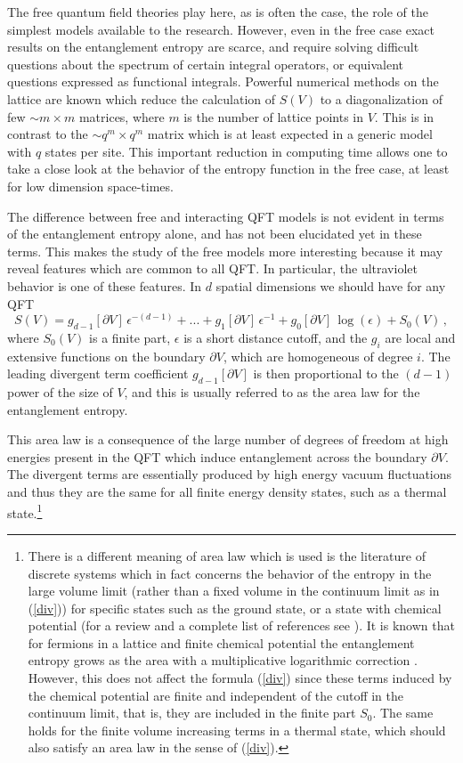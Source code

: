 \documentclass[a4paper]{article}
\begin{document}
The free quantum field theories play here, as is often the case, the role of the simplest models available to the research. However, even in the free case exact results on the entanglement entropy are scarce, and require  solving difficult questions about the spectrum of certain integral operators, or equivalent questions expressed as functional integrals. Powerful numerical methods on the lattice are known which reduce the calculation of $S(V)$ to a diagonalization of few $\sim m\times m$ matrices, where $m$ is the number of lattice points in $V$. 
This is in contrast to the $\sim q^m\times q^m$ matrix which is at least expected in a generic model with $q$ states per site. This important reduction in computing time allows one to take a close look at the behavior of the entropy function in the free case, at least for low dimension space-times. 
 
The difference between free and interacting QFT models is not evident in terms of the entanglement entropy alone, and has not been elucidated yet in these terms. This makes the study of the free models more interesting because it may reveal features which are common to all QFT. In particular, the ultraviolet behavior is one of these features. In $d$ spatial dimensions we should have for any QFT 
 \begin{equation}
 S(V)=g_{d-1}[\partial V]\,\epsilon^{-(d-1)}+...+ g_1[\partial V]\,\epsilon^{-1} + g_0[\partial V]\,\log (\epsilon)+ S_0(V)\,,   \label{div}
 \end{equation}
where $S_0(V)$ is a finite part, $\epsilon$ is a short distance cutoff, and the $g_i$ are local and extensive  functions on the boundary $\partial V$, which are homogeneous of degree $i$. The leading divergent term coefficient  $g_{d-1}[\partial V]$ is then proportional to the $(d-1)$ power of the size of $V$, and this is usually referred to as the area law for the entanglement entropy. 

This area law is a consequence of the large number of degrees of freedom at high energies present in the QFT which induce entanglement across the boundary $\partial V$. The divergent terms are essentially produced by high energy vacuum fluctuations and thus they are the same for all finite energy density states, such as a thermal state.\footnote{There is a different meaning of area law which is used is the literature of discrete systems which in fact concerns the behavior of the entropy in the large volume limit (rather than a fixed volume in the continuum limit as in (\ref{div})) for specific states such as the ground state, or a state with chemical potential (for a review and a complete list of references see \cite{ecp}). It is known that for fermions in a lattice and finite chemical potential the entanglement entropy grows as the area with a multiplicative logarithmic correction \cite{fermionic1}. However, this does not affect the formula (\ref{div}) since these terms induced by the chemical potential are finite and independent of the cutoff in the continuum limit, that is, they are included in the finite part $S_0$. The same holds for the finite volume increasing terms in a thermal state, which should also satisfy an area law in the sense of (\ref{div}).} 
\end{document}
